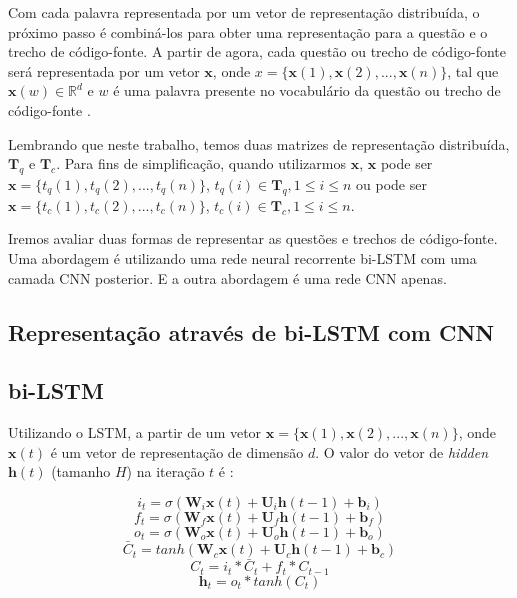 Com cada palavra representada por um vetor de representação distribuída, o próximo passo é combiná-los para obter uma representação para a questão e o trecho de código-fonte. A partir de agora, cada questão ou trecho de código-fonte será representada por um vetor $\bm{x}$, onde $x = \{ \bm{x}(1), \bm{x}(2), . . ., \bm{x}(n) \}$, tal que $\bm{x}(w) \in \mathbb{R}^{d}$ e $w$ é uma palavra presente no vocabulário da questão ou trecho de código-fonte \citep{cambronero-deep-learning-code-search:2019}. 

Lembrando que neste trabalho, temos duas matrizes de representação distribuída, $\bm{T}_{q}$ e $\bm{T}_{c}$. Para fins de simplificação, quando utilizarmos $\bm{x}$, $\bm{x}$ pode ser $\bm{x} = \{ t_{q}(1), t_{q}(2), . . ., t_{q}(n)\}$, $t_{q}(i) \in \bm{T}_{q}, 1 \leq i \leq n$ ou pode ser $\bm{x} = \{ t_{c}(1), t_{c}(2), . . ., t_{c}(n)\}$, $t_{c}(i) \in \bm{T}_{c}, 1 \leq i \leq n$.


Iremos avaliar duas formas de representar as questões e trechos de código-fonte. Uma abordagem é utilizando uma rede neural recorrente bi-LSTM com uma camada CNN posterior. E a outra abordagem é uma rede CNN apenas.

\subsection{Representação através de bi-LSTM com CNN}
\label{sec:representation-bi-lstm-cnn}
\subsection{bi-LSTM}
\label{sec:representation-bi-lstm}
Utilizando o LSTM, a partir de um vetor $\bm{x} = \{ \bm{x}(1), \bm{x}(2), . . ., \bm{x}(n) \}$, onde $\bm{x}(t)$ é um vetor de representação de dimensão $d$. O valor do vetor de \textit{hidden} $\bm{h}(t)$ (tamanho $H$) na iteração $t$ é \citep{tan-lstm-qa}:

\begin{equation}
    i_{t} = \sigma(\bm{W}_{i}\bm{x}(t) + \bm{U}_{i}\bm{h}(t - 1) + \bm{b}_{i})
\end{equation}
\begin{equation}
    f_{t} = \sigma(\bm{W}_{f}\bm{x}(t) + \bm{U}_{f}\bm{h}(t - 1) + \bm{b}_{f})
\end{equation}
\begin{equation}
    o_{t} = \sigma(\bm{W}_{o}\bm{x}(t) + \bm{U}_{o}\bm{h}(t - 1) + \bm{b}_{o})
\end{equation}
\begin{equation}
    \bar{C}_{t} = tanh(\bm{W}_{c}\bm{x}(t) + \bm{U}_{c}\bm{h}(t - 1) + \bm{b}_{c})
\end{equation}
\begin{equation}
    C_{t} = i_{t} * \bar{C}_t + f_{t} * C_{t - 1}
\end{equation}
\begin{equation}
    \bm{h}_{t} = o_{t} * tanh(C_{t})
\end{equation}

